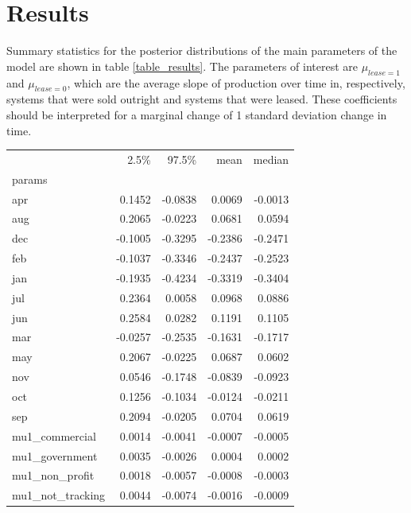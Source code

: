 \documentclass[12pt]{article}
\begin{document}
\section{Results}

Summary statistics for the posterior distributions of the main parameters of the model are shown in table \ref{table_results}. The parameters of interest are $\mu_{lease=1}$ and $\mu_{lease=0}$, which are the average slope of production over time in, respectively, systems that were sold outright and systems that were leased. These coefficients should be interpreted for a marginal change of 1 standard deviation change in time. 

\begin{table}
\footnotesize
\resizebox{12cm}{!} {
\begin{tabular}{lrrrr}
\toprule
{} &  2.5\%&   97.5\% &   mean &  median \\
params           &          &          &         &          \\
\midrule
apr              &   0.1452 &  -0.0838 &  0.0069 &  -0.0013 \\
aug              &   0.2065 &  -0.0223 &  0.0681 &   0.0594 \\
dec              &  -0.1005 &  -0.3295 & -0.2386 &  -0.2471 \\
feb              &  -0.1037 &  -0.3346 & -0.2437 &  -0.2523 \\
jan              &  -0.1935 &  -0.4234 & -0.3319 &  -0.3404 \\
jul              &   0.2364 &   0.0058 &  0.0968 &   0.0886 \\
jun              &   0.2584 &   0.0282 &  0.1191 &   0.1105 \\
mar              &  -0.0257 &  -0.2535 & -0.1631 &  -0.1717 \\
may              &   0.2067 &  -0.0225 &  0.0687 &   0.0602 \\
nov              &   0.0546 &  -0.1748 & -0.0839 &  -0.0923 \\
oct              &   0.1256 &  -0.1034 & -0.0124 &  -0.0211 \\
sep              &   0.2094 &  -0.0205 &  0.0704 &   0.0619 \\
mu1\_commercial   &   0.0014 &  -0.0041 & -0.0007 &  -0.0005 \\
mu1\_government   &   0.0035 &  -0.0026 &  0.0004 &   0.0002 \\
mu1\_non\_profit   &   0.0018 &  -0.0057 & -0.0008 &  -0.0003 \\
mu1\_not\_tracking &   0.0044 &  -0.0074 & -0.0016 &  -0.0009 \\

\end{tabular}}
\end{table}
\end{document}
